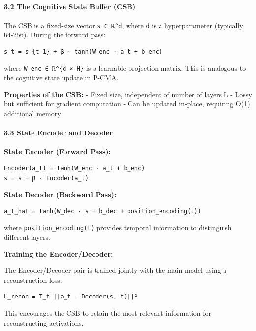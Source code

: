 \documentclass[
  11pt,
  a4paper,
]{article}
\begin{document}
\paragraph{3.2 The Cognitive State Buffer
(CSB)}\label{the-cognitive-state-buffer-csb}

The CSB is a fixed-size vector \texttt{s\ ∈\ ℝ\^{}d}, where \texttt{d}
is a hyperparameter (typically 64-256). During the forward pass:

\begin{verbatim}
s_t = s_{t-1} + β · tanh(W_enc · a_t + b_enc)
\end{verbatim}

where \texttt{W\_enc\ ∈\ ℝ\^{}\{d\ ×\ H\}} is a learnable projection
matrix. This is analogous to the cognitive state update in P-CMA.

\textbf{Properties of the CSB:} - Fixed size, independent of number of
layers L - Lossy but sufficient for gradient computation - Can be
updated in-place, requiring O(1) additional memory

\paragraph{3.3 State Encoder and
Decoder}\label{state-encoder-and-decoder}

\textbf{State Encoder (Forward Pass):}

\begin{verbatim}
Encoder(a_t) = tanh(W_enc · a_t + b_enc)
s = s + β · Encoder(a_t)
\end{verbatim}

\textbf{State Decoder (Backward Pass):}

\begin{verbatim}
a_t_hat = tanh(W_dec · s + b_dec + position_encoding(t))
\end{verbatim}

where \texttt{position\_encoding(t)} provides temporal information to
distinguish different layers.

\textbf{Training the Encoder/Decoder:}

The Encoder/Decoder pair is trained jointly with the main model using a
reconstruction loss:

\begin{verbatim}
L_recon = Σ_t ||a_t - Decoder(s, t)||²
\end{verbatim}

This encourages the CSB to retain the most relevant information for
reconstructing activations.
\end{document}
